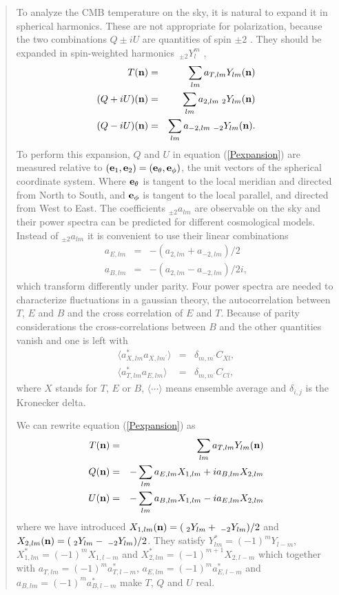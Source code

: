 \documentclass[12pt,twoside]{article}
\newcommand{\myhtmlimage}[1]{ }
\begin{document}
\begin{quotation}
To analyze the CMB temperature on the sky, it is natural to
expand it in spherical harmonics. These are not appropriate 
for polarization, because   
the two combinations $Q\pm iU$ are quantities of spin $\pm 2$
\citep{goldberg}. They 
should be expanded in spin-weighted harmonics $\, _{\pm2}Y_l^m$ 
\citep{spinlong, longspin},
\begin{eqnarray}
  T(\vecn) &=& \sum_{lm} a_{T,lm} Y_{lm}(\vecn) \nonumber \\
  (Q+iU)(\vecn) &=& \sum_{lm} 
  a_{2,lm}\;_2Y_{lm}(\vecn) \nonumber \myhtmlimage{} \\
  (Q-iU)(\vecn) &=& \sum_{lm}
  a_{-2,lm}\;_{-2}Y_{lm}(\vecn).
  \myhtmlimage{}   \label{Pexpansion}
\end{eqnarray}
To perform this expansion, $Q$ and $U$ in equation (\ref{Pexpansion})
are measured relative to $(\textbf{e}_{1}, \textbf{e}_{2})=(\textbf{e}_\theta, \textbf{e}_\phi)$, the unit vectors of the spherical coordinate system.
Where $\textbf{e}_\theta$ is tangent to the local meridian and directed from North
to South, and $\textbf{e}_\phi$ is tangent to the local parallel, and directed from
West to East.
The coefficients $_{\pm 2}a_{lm}$ 
are observable on the sky and their power spectra
can be 
predicted for different cosmological models. Instead of $_{\pm 2}a_{lm}$
it is convenient
to use their linear combinations
\begin{eqnarray}
a_{E,lm} &=& -(a_{2,lm}+a_{-2,lm})/2  \nonumber \myhtmlimage{} \\
a_{B,lm} &=& -(a_{2,lm}-a_{-2,lm})/2i, \myhtmlimage{}
\end{eqnarray}
which transform differently 
under parity.
Four power spectra are needed to
characterize fluctuations in a gaussian theory,
the autocorrelation between 
$T$, $E$ and $B$ and the cross correlation of $E$ and $T$.
Because of parity considerations the cross-correlations
between $B$ and the
other quantities vanish and one is left with
\begin{eqnarray}
  \langle a_{X,lm}^{*}
  a_{X,lm^\prime}\rangle &=& \delta_{m,m^\prime}C_{Xl},\nonumber \\
  \langle a_{T,lm}^{*}a_{E,lm}\rangle &=& \delta_{m,m^\prime}C_{Cl},\myhtmlimage{}\label{Cls} 
\end{eqnarray}
where
$X$ stands for $T$, $E$ or $B$, $\langle\cdots \rangle$
means ensemble average and $\delta_{i,j}$ is the Kronecker delta.  

We can rewrite 
equation (\ref{Pexpansion}) as
\begin{eqnarray}
 T(\vecn) &=& \sum_{lm} a_{T,lm} Y_{lm}(\vecn) \nonumber \\
 Q(\vecn) &=& -\sum_{lm} a_{E,lm} X_{1,lm} 
   +i a_{B,lm}X_{2,lm} \nonumber \\
 U(\vecn) &=& -\sum_{lm} a_{B,lm} X_{1,lm}-i a_{E,lm} X_{2,lm}
 \myhtmlimage{}
 \label{Pexpansion2}
\end{eqnarray}
where we have introduced
$X_{1,lm}(\textbf{n})=(\;_2Y_{lm}+\;_{-2}Y_{lm})/2$
and $X_{2,lm}(\textbf{n})=(\;_2Y_{lm}-\;_{-2}Y_{lm})/ 2$.
They satisfy $Y^{*}_{lm} = (-1)^m Y_{l-m}$, 
$X^{*}_{1,lm}=(-1)^m X_{1,l-m}$  and 
$X^*_{2,lm}=(-1)^{m+1}X_{2,l-m}$ which
together with $a_{T,lm}=(-1)^m a_{T,l-m}^*$, $a_{E,lm}=(-1)^m a_{E,l-m}^*$ and
$a_{B,lm}=(-1)^m a_{B,l-m}^*$ make $T$, $Q$ and $U$ real.


\end{quotation}
\end{document}
